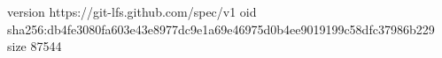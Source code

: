 version https://git-lfs.github.com/spec/v1
oid sha256:db4fe3080fa603e43e8977dc9e1a69e46975d0b4ee9019199c58dfc37986b229
size 87544
